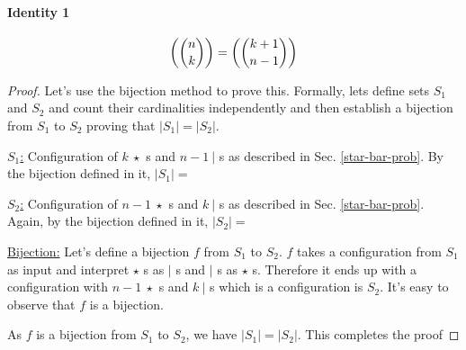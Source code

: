 \paragraph{Identity 1} $$\textrm{$\left(\binom{n}{k}\right)$}=\textrm{$\left(\binom{k+1}{n-1}\right)$}$$
\begin{proof}
Let's use the bijection method to prove this. Formally, lets define sets $S_1$ and $S_2$ and count their cardinalities independently and then establish a bijection from $S_1$ to $S_2$ proving that $|S_1|=|S_2|$.
\begin{description}
\item \underline{$S_1$:} Configuration of $k~\star$ s and $n-1~|$ s as described in Sec. \ref{star-bar-prob}. By the bijection defined in it, $|S_1|=$ 
\item \underline{$S_2$:} Configuration of $n-1~\star$ s and $k~|$ s as described in Sec. \ref{star-bar-prob}. Again, by the bijection defined in it, $|S_2|=$
\item \underline{Bijection:} Let's define a bijection $f$ from $S_1$ to $S_2$. $f$ takes a configuration from $S_1$ as input and interpret $\star$ s as $|$ s and $|$ s as $\star$ s. Therefore it ends up with a configuration with $n-1~\star$ s and $k~|$ s which is a configuration is $S_2$. It's easy to observe that $f$ is a bijection.
\end{description}
As $f$ is a bijection from $S_1$ to $S_2$, we have $|S_1|=|S_2|$. This completes the proof 
\end{proof}

